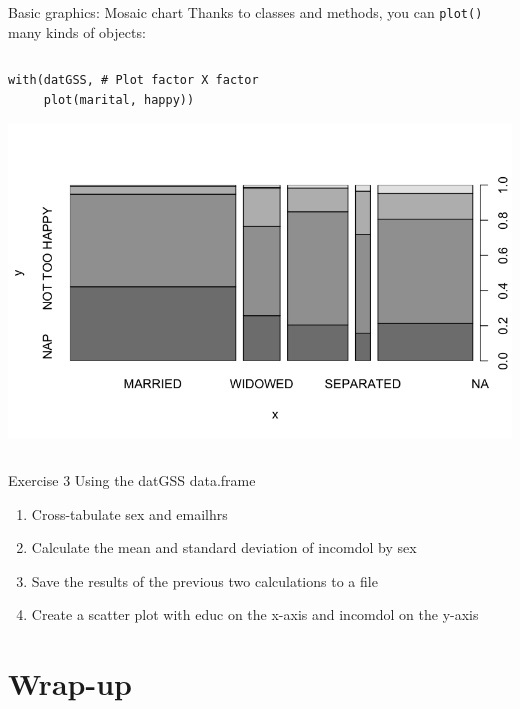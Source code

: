 \documentclass[table,smaller]{beamer}
\begin{document}
\begin{frame}[fragile,label=sec-6-9]{Basic graphics: Mosaic chart}
 Thanks to classes and methods, you can \verb~plot()~ many kinds of objects:
\begin{columns}  \begin{block}{}
\begin{verbatim}
with(datGSS, # Plot factor X factor
     plot(marital, happy))
\end{verbatim}
\includegraphics[width=.95\textwidth]{images/examplePlot3.png}

\end{block} \end{columns}
\end{frame}
\begin{frame}[label=sec-6-10]{Exercise 3}
Using the datGSS data.frame

\begin{enumerate}
\item Cross-tabulate sex and emailhrs
\item Calculate the mean and standard deviation of incomdol by sex
\item Save the results of the previous two calculations to a file
\item Create a scatter plot with educ on the x-axis and incomdol on the y-axis
\end{enumerate}
\end{frame}
\section{Wrap-up}
\label{sec-7}
\end{document}
